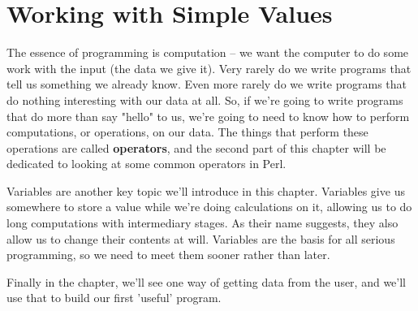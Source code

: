 \documentclass[a4paper,11pt]{book}
\begin{document}

\noindent 

\noindent 

\noindent 

\noindent 

\noindent 

\noindent 

\noindent 

\noindent 

\noindent 

\noindent 

\noindent 

\noindent 

\noindent 

\noindent 

\noindent 

\noindent 
\section{Working with Simple Values}

\noindent 

\noindent 

\noindent 

\noindent 

\noindent The essence of programming is computation -- we want the computer to do some work with the input (the data we give it). Very rarely do we write programs that tell us something we already know. Even more rarely do we write programs that do nothing interesting with our data at all. So, if we're going to write programs that do more than say "hello" to us, we're going to need to know how to perform computations, or operations, on our data. The things that perform these operations are called \textbf{operators}, and the second part of this chapter will be dedicated to looking at some common operators in Perl.

\noindent 

\noindent Variables are another key topic we'll introduce in this chapter. Variables give us somewhere to store a value while we're doing calculations on it, allowing us to do long computations with intermediary stages. As their name suggests, they also allow us to change their contents at will. Variables are the basis for all serious programming, so we need to meet them sooner rather than later.

\noindent 

\noindent Finally in the chapter, we'll see one way of getting data from the user, and we'll use that to build our first 'useful' program.
\end{document}
